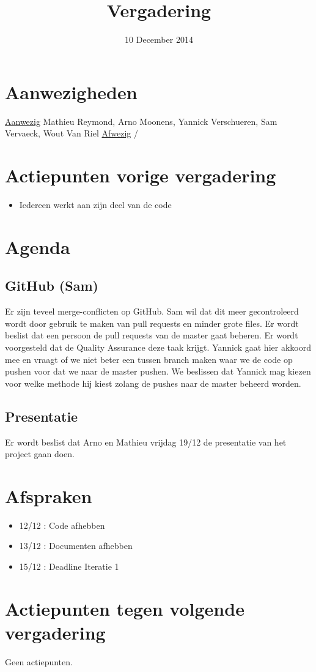 \title{Vergadering}
\author{}
\date{10 December 2014}



\maketitle

\section{Aanwezigheden}
\underline{Aanwezig}  \newline
Mathieu Reymond, Arno Moonens, Yannick Verschueren, Sam Vervaeck, Wout Van Riel
\newline
\underline{Afwezig} \newline
/
\section{Actiepunten vorige vergadering}
\begin{itemize}
\item Iedereen werkt aan zijn deel van de code
\end{itemize}

\section{Agenda}
\subsection{GitHub (Sam)}
Er zijn teveel merge-conflicten op GitHub. Sam wil dat dit meer gecontroleerd wordt door gebruik te maken van pull requests en minder grote files.
Er wordt beslist dat een persoon de pull requests van de master gaat beheren. Er wordt voorgesteld dat de Quality Assurance deze taak krijgt.
Yannick gaat hier akkoord mee en vraagt of we niet beter een tussen branch maken waar we de code op pushen voor dat we naar de master pushen.
We beslissen dat Yannick mag kiezen voor welke methode hij kiest zolang de pushes naar de master beheerd worden.

\subsection{Presentatie}
Er wordt beslist dat Arno en Mathieu vrijdag 19/12 de presentatie van het project gaan doen.

\section{Afspraken}
\begin{itemize}
\item 12/12 : Code afhebben
\item 13/12 : Documenten afhebben
\item 15/12 : Deadline Iteratie 1
\end{itemize}

\section{Actiepunten tegen volgende vergadering}
Geen actiepunten.

